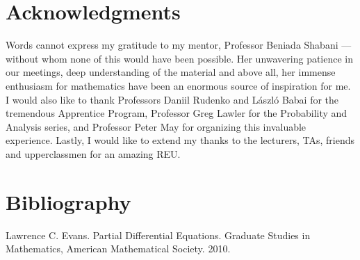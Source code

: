 \documentclass[openany, amssymb, psamsfonts]{amsart}
\newtheorem{thm}{Theorem}[section]
\theoremstyle{definition}
\numberwithin{equation}{section}
\newcommand{\bbr}{\mathbb{R}}
\newcommand{\bbz}{\mathbb{Z}}
\newcommand{\call}{\mathcal{L}}
\let\oldforall\forall
\renewcommand{\forall}{\;\oldforall\; }
\begin{document}





\newpage
\section*{Acknowledgments} Words cannot express my gratitude to my mentor, Professor Beniada Shabani --- without whom none of this would have been possible. Her unwavering patience in our meetings, deep understanding of the material and above all, her immense enthusiasm for mathematics have been an enormous source of inspiration for me. I would also like to thank Professors Daniil Rudenko and L\'{a}szl\'{o} Babai for the tremendous Apprentice Program, Professor Greg Lawler for the Probability and Analysis series, and Professor Peter May for organizing this invaluable experience. Lastly, I would like to extend my thanks to the lecturers, TAs, friends and upperclassmen for an amazing REU.

\section{Bibliography}
\begin{thebibliography}{9}
     Lawrence C. Evans. Partial Differential Equations. Graduate Studies in Mathematics, American Mathematical Society. 2010.

\end{thebibliography}
\end{document}
